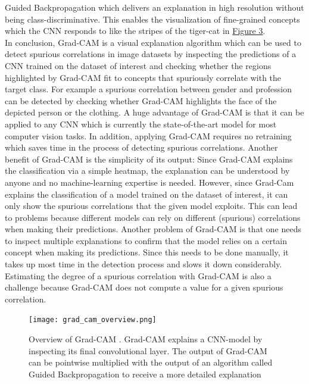 \documentclass{article}
\begin{document}
Guided Backpropagation which delivers an explanation in high resolution without being class-discriminative.
This enables the visualization of fine-grained concepts which the CNN responds to like
the stripes of the tiger-cat in \hyperref[fig:gradcam]{Figure 3}. \\
In conclusion, Grad-CAM is a visual explanation algorithm which can be used to detect spurious correlations
in image datasets by inspecting the predictions of a CNN trained on the dataset of interest and checking whether the regions
highlighted by Grad-CAM fit to concepts that spuriously correlate with the target class.
For example a spurious correlation between gender and profession can be detected by checking whether Grad-CAM
highlights the face of the depicted person or the clothing. 
A huge advantage of Grad-CAM is that it can be applied to any CNN which is currently the state-of-the-art model
for most computer vision tasks. In addition, applying Grad-CAM requires no retraining which saves time in the process
of detecting spurious correlations. Another benefit of Grad-CAM is the simplicity of its output:
Since Grad-CAM explains the classification via a  simple heatmap, the explanation can be understood by anyone
and no machine-learning expertise is needed. 
However, since Grad-Cam explains the classification of a model trained on the dataset of interest,
it can only show the spurious correlations that the given model exploits. This can lead to problems because
different models can rely on different (spurious) correlations when making their predictions.
Another problem of Grad-CAM is that one needs to inspect multiple explanations to confirm that the model
relies on a certain concept when making its predictions. Since this needs to be done manually, it takes up
most time in the detection process and slows it down considerably. Estimating the degree of a spurious correlation
with Grad-CAM is also a challenge because Grad-CAM does not compute a value for a given spurious correlation.

\begin{figure}
    \centering
    \texttt{[image: grad\_cam\_overview.png]}
    \caption{Overview of Grad-CAM \cite{Selvaraju_2017_ICCV}. Grad-CAM explains
    a CNN-model by inspecting its final convolutional layer. The output of Grad-CAM can be pointwise multiplied
    with the output of an algorithm called Guided Backpropagation \cite{springenberg2015striving} to receive a
    more detailed explanation}
    \label{fig:gradcam}
\end{figure}
\end{document}
